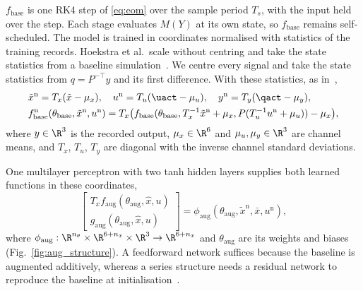 $f_{\mathrm{base}}$ is one RK4 step of \eqref{eq:eom} over the sample period
$T_s$, with the input held over the step.
Each stage evaluates $M(Y)$ at its own state, so $f_{\mathrm{base}}$ remains
self-scheduled.
The model is trained in coordinates normalised with statistics of the
training records.
Hoekstra et al.\ scale without centring and take the state statistics from a
baseline simulation~\cite[Sec.~5.3]{hoekstra2026lfr}.
We centre every signal and take the state statistics from $q=P^{-\top}y$ and
its first difference.
With these statistics, as in~\cite[Eq.~(28)]{hoekstra2026lfr},
\begin{equation}
\begin{aligned}
 &\tilde x^{\mathrm n}=T_x(\tilde x-\mu_x),\quad
 u^{\mathrm n}=T_u(\uact-\mu_u),\quad
 y^{\mathrm n}=T_y(\qact-\mu_y),\\
 &f^{\mathrm n}_{\mathrm{base}}(\theta_{\mathrm{base}},\tilde x^{\mathrm n},u^{\mathrm n})
 =T_x\bigl(f_{\mathrm{base}}(\theta_{\mathrm{base}},T_x^{-1}\tilde x^{\mathrm n}+\mu_x,
 P(T_u^{-1}u^{\mathrm n}+\mu_u))-\mu_x\bigr),
\end{aligned}
\label{eq:aug_norm}
\end{equation}
where $y\in\R^3$ is the recorded output, $\mu_x\in\R^6$ and
$\mu_u,\mu_y\in\R^3$ are channel means, and $T_x$, $T_u$, $T_y$ are diagonal
with the inverse channel standard deviations.

One multilayer perceptron with two tanh hidden layers supplies both learned
functions in these coordinates,
\begin{equation}
 \begin{bmatrix}
  T_xf_{\mathrm{aug}}(\theta_{\mathrm{aug}},\hat x,u)\\
  g_{\mathrm{aug}}(\theta_{\mathrm{aug}},\hat x,u)
 \end{bmatrix}
 =\phi_{\mathrm{aug}}(\theta_{\mathrm{aug}},\tilde x^{\mathrm n},\bar x,u^{\mathrm n}),
 \label{eq:aug_network}
\end{equation}
where $\phi_{\mathrm{aug}}:\R^{n_\theta}\times\R^{6+n_{\bar x}}\times\R^3\to\R^{6+n_{\bar x}}$
and $\theta_{\mathrm{aug}}$ are its weights and biases
(Fig.~\ref{fig:aug_structure}).
A feedforward network suffices because the baseline is augmented additively,
whereas a series structure needs a residual network to reproduce the baseline
at initialisation~\cite[Sec.~4.3]{hoekstra2025lfr}.

